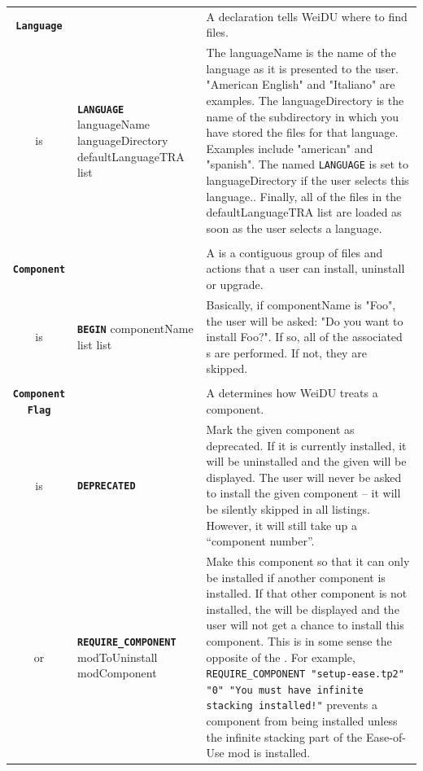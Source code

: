 \documentclass{article}
\def\ttref#1{\ahrefloc{#1}{\tt #1}}
\def\DEFINE#1{{\tt \bf #1}\label{#1}\index{#1}}
\def\DEFSYN#1{{\tt \bf #1}\index{#1}}
\def\t#1{{\tt #1}}
\def\Slist{{\color{red} list }}
\begin{document}
\begin{tabular}{cp{10in}|p{10in}}
\\

\DEFINE{Language} & &
  A \ttref{Language} declaration tells WeiDU where to find \ttref{TRA}
  files. \\

  is & \DEFINE{LANGUAGE} languageName
       languageDirectory
       defaultLanguageTRA \Slist &
       The languageName is the name of the language as it is presented to
       the user. "American English" and "Italiano" are
       examples. The languageDirectory is the name of the subdirectory in
       which you have stored the \ttref{TRA} files for that language.
       Examples include "american" and "spanish". The \ttref{variable}
       named \t{LANGUAGE} is set to languageDirectory if the user selects
       this language.. Finally, all of the \ttref{TRA} files in the
       defaultLanguageTRA list are loaded as soon as the user selects a
       language.  \\
\\

\DEFINE{Component}\label{component} & &
  A \ttref{Component} is a contiguous group of files and actions that a
  user can install, uninstall or upgrade. \\

  is & \DEFSYN{BEGIN} componentName
    \ttref{Component Flag} \Slist
    \ttref{TP2 Action} \Slist &
    Basically, if componentName is "Foo", the user will be asked: "Do you
    want to install Foo?". If so, all of the associated \ttref{TP2 Action}s
    are performed. If not, they are skipped. \\

\\

\DEFINE{Component Flag} &&
  A \ttref{Component Flag} determines how WeiDU treats a component. \\

  is & \DEFINE{DEPRECATED} \ttref{String} &
      Mark the given component as deprecated. If it is currently installed,
      it will be uninstalled and the given \ttref{String} will be
      displayed. The user will never be asked to install the given
      component -- it will be silently skipped in all listings. However, it
      will still take up a ``component number''. \\

  or & \DEFINE{REQUIRE_COMPONENT} modToUninstall modComponent
      \ttref{String} &
      Make this component so that it can only be installed if another
      component is installed. If that other component is not installed, the
      \ttref{String} will be displayed and the user will not get a chance
      to install this component. This is in some sense the opposite of the
      \ttref{UNINSTALL} \ttref{TP2 Action}. For example,
      \t{REQUIRE_COMPONENT "setup-ease.tp2" "0" "You must have infinite
      stacking installed!"} prevents a component from being installed
      unless the infinite stacking part of the Ease-of-Use mod is
      installed.  \\


\end{tabular}
\end{document}
